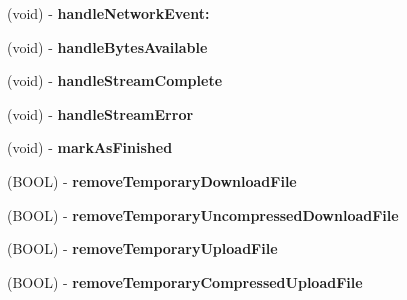 \begin{DoxyCompactItemize}
\item 
\hypertarget{interface_a_s_i_h_t_t_p_request_a271ec6e669cafa5063866022fb3577ba}{
(void) -\/ {\bfseries handle\-Network\-Event\-:}}
\label{interface_a_s_i_h_t_t_p_request_a271ec6e669cafa5063866022fb3577ba}

\item 
\hypertarget{interface_a_s_i_h_t_t_p_request_aefae44a699dc9e70b78930322cfb3558}{
(void) -\/ {\bfseries handle\-Bytes\-Available}}
\label{interface_a_s_i_h_t_t_p_request_aefae44a699dc9e70b78930322cfb3558}

\item 
\hypertarget{interface_a_s_i_h_t_t_p_request_aaf27f7d11cd1194d5087db56cc553d89}{
(void) -\/ {\bfseries handle\-Stream\-Complete}}
\label{interface_a_s_i_h_t_t_p_request_aaf27f7d11cd1194d5087db56cc553d89}

\item 
\hypertarget{interface_a_s_i_h_t_t_p_request_ab792c755bbcec55490688d2b5aa729ec}{
(void) -\/ {\bfseries handle\-Stream\-Error}}
\label{interface_a_s_i_h_t_t_p_request_ab792c755bbcec55490688d2b5aa729ec}

\item 
\hypertarget{interface_a_s_i_h_t_t_p_request_a0b812d27bc2a7ad7715e6d890923426e}{
(void) -\/ {\bfseries mark\-As\-Finished}}
\label{interface_a_s_i_h_t_t_p_request_a0b812d27bc2a7ad7715e6d890923426e}

\item 
\hypertarget{interface_a_s_i_h_t_t_p_request_a0e68fd4f22a1b5cdcfb3e63a3cdacde9}{
(\-B\-O\-O\-L) -\/ {\bfseries remove\-Temporary\-Download\-File}}
\label{interface_a_s_i_h_t_t_p_request_a0e68fd4f22a1b5cdcfb3e63a3cdacde9}

\item 
\hypertarget{interface_a_s_i_h_t_t_p_request_af8ef43877926d01b8a51abb62dd2e208}{
(\-B\-O\-O\-L) -\/ {\bfseries remove\-Temporary\-Uncompressed\-Download\-File}}
\label{interface_a_s_i_h_t_t_p_request_af8ef43877926d01b8a51abb62dd2e208}

\item 
\hypertarget{interface_a_s_i_h_t_t_p_request_aaf8e3adbbf00110b67232158921553c0}{
(\-B\-O\-O\-L) -\/ {\bfseries remove\-Temporary\-Upload\-File}}
\label{interface_a_s_i_h_t_t_p_request_aaf8e3adbbf00110b67232158921553c0}

\item 
\hypertarget{interface_a_s_i_h_t_t_p_request_a4f8b19d66be57ffad0d6128182c98414}{
(\-B\-O\-O\-L) -\/ {\bfseries remove\-Temporary\-Compressed\-Upload\-File}}
\label{interface_a_s_i_h_t_t_p_request_a4f8b19d66be57ffad0d6128182c98414}


\end{DoxyCompactItemize}
